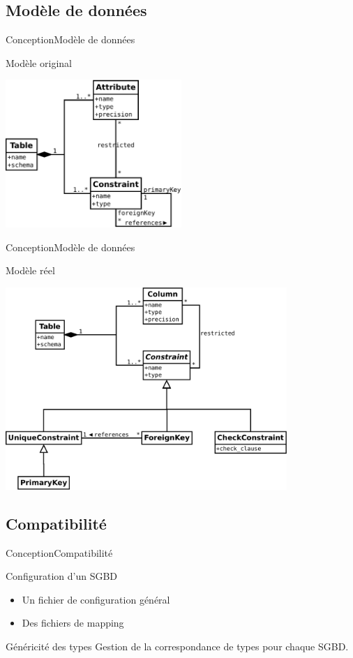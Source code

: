 \subsection{Modèle de données}
\begin{frame}{Conception}{Modèle de données}
\begin{block}{Modèle original}
\begin{center}
\includegraphics[width=0.5\textwidth]{files/diag_class_origine}
\end{center}
\end{block}
\end{frame}

\begin{frame}{Conception}{Modèle de données}
\begin{block}{Modèle réel}
\begin{center}
\includegraphics[width=0.8\textwidth]{files/diag_class_ameliore}
\end{center}
\end{block}
\end{frame}

\subsection{Compatibilité}
\begin{frame}{Conception}{Compatibilité}
\begin{block}{Configuration d'un SGBD}
	\begin{itemize}
	\item Un fichier de configuration général
	\item Des fichiers de mapping
	\end{itemize}
\end{block}
\begin{block}{Généricité des types}
Gestion de la correspondance de types pour chaque SGBD.
\end{block}
\end{frame}

